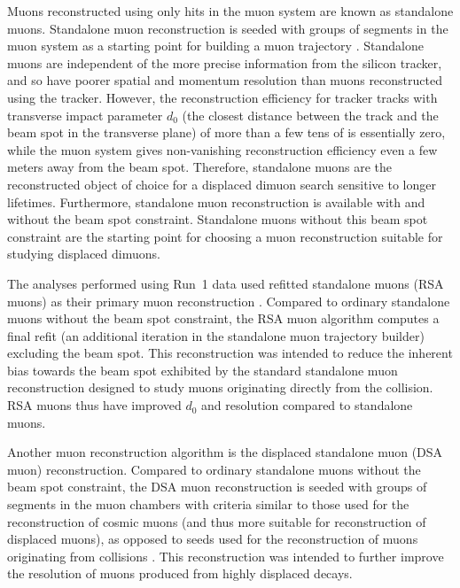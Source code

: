 Muons reconstructed using only hits in the muon system are known as standalone muons.
Standalone muon reconstruction is seeded with groups of segments in the muon system as a starting point for building a muon trajectory \cite{Liu2008}.
Standalone muons are independent of the more precise information from the silicon tracker, and so have poorer spatial and momentum resolution than muons reconstructed using the tracker.
However, the reconstruction efficiency for tracker tracks with transverse impact parameter $d_0$ (the closest distance between the track and the beam spot in the transverse plane) of more than a few tens of \cm is essentially zero, while the muon system gives non-vanishing reconstruction efficiency even a few meters away from the beam spot.
Therefore, standalone muons are the reconstructed object of choice for a displaced dimuon search sensitive to longer lifetimes.
Furthermore, standalone muon reconstruction is available with and without the beam spot constraint.
Standalone muons without this beam spot constraint are the starting point for choosing a muon reconstruction suitable for studying displaced dimuons.

The analyses performed using Run~1 data used refitted standalone muons (RSA muons) as their primary muon reconstruction \cite{CMS-PAS-EXO-14-012,CMS-AN-14-176}.
Compared to ordinary standalone muons without the beam spot constraint, the RSA muon algorithm computes a final refit (an additional iteration in the standalone muon trajectory builder) excluding the beam spot.
This reconstruction was intended to reduce the inherent bias towards the beam spot exhibited by the standard standalone muon reconstruction designed to study muons originating directly from the \pp collision.
RSA muons thus have improved $d_0$ and \pT resolution compared to standalone muons.

Another muon reconstruction algorithm is the displaced standalone muon (DSA muon) reconstruction.
Compared to ordinary standalone muons without the beam spot constraint, the DSA muon reconstruction is seeded with groups of segments in the muon chambers with criteria similar to those used for the reconstruction of cosmic muons (and thus more suitable for reconstruction of displaced muons), as opposed to seeds used for the reconstruction of muons originating from \pp collisions \cite{Liu2008, CMS-DP-2015-015}.
This reconstruction was intended to further improve the \pT resolution of muons produced from highly displaced decays.

